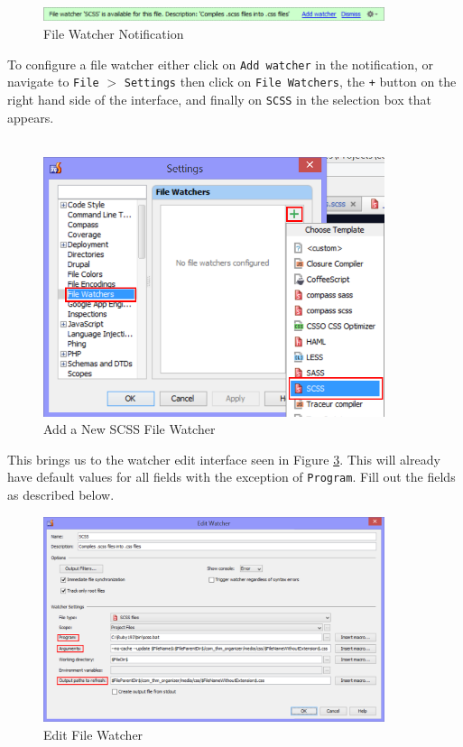 \documentclass[]{report}
\begin{document}
\begin{figure}[h] 
	\centering
	\includegraphics[width=10cm]{scsswatchernotification.png}
	\caption{File Watcher Notification}
	\label{fig:watchernotification}
\end{figure}

\noindent
To configure a file watcher either click on \texttt{Add watcher} in the notification, or navigate to \texttt{File} $>$ \texttt{Settings} then click on \texttt{File Watchers}, the \texttt{+} button on the right hand side of the interface, and finally on \texttt{SCSS} in the selection box that appears.\\
\\

\begin{figure}[h] 
	\centering
	\includegraphics[width=10cm]{settingsfilewatchers.png}
	\caption{Add a New SCSS File Watcher}
	\label{fig:addscssfilewatcher}
\end{figure}

\newpage

\noindent
This brings us to the watcher edit interface seen in Figure \ref{fig:watcheredit}. This will already have default values for all fields with the exception of \texttt{Program}. Fill out the fields as described below.\\


\begin{figure}[h] 
  \centering
     \includegraphics[width=10cm]{editwatcher.png}
  \caption{Edit File Watcher}
  \label{fig:watcheredit}
\end{figure}
\end{document}
